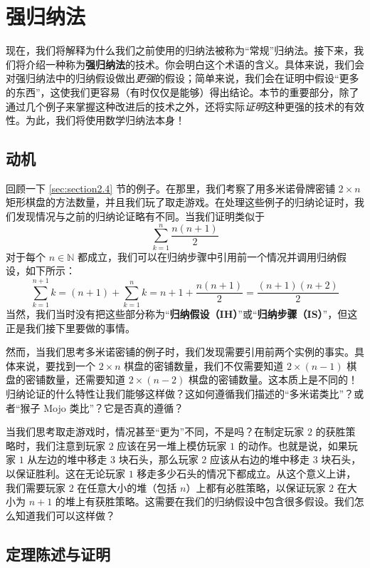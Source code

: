\section{强归纳法}

现在，我们将解释为什么我们之前使用的归纳法被称为``常规''归纳法。接下来，我们将介绍一种称为\textbf{强归纳法}的技术。你会明白这个术语的含义。具体来说，我们会对强归纳法中的归纳假设做出\emph{更强}的假设；简单来说，我们会在证明中假设``更多的东西''，这使我们更容易（有时仅仅是能够）得出结论。本节的重要部分，除了通过几个例子来掌握这种改进后的技术之外，还将实际\emph{证明}这种更强的技术的有效性。为此，我们将使用数学归纳法本身！

\subsection{动机}

回顾一下 \ref{sec:section2.4} 节的例子。在那里，我们考察了用多米诺骨牌密铺 $2 \times n$ 矩形棋盘的方法数量，并且我们玩了取走游戏。在处理这些例子的归纳论证时，我们发现情况与之前的归纳论证略有不同。当我们证明类似于
\[\sum_{k=1}^{n} \frac{n(n+1)}{2}\]
对于每个 $n \in \mathbb{N}$ 都成立，我们可以在归纳步骤中引用前一个情况并调用归纳假设，如下所示：
\[\sum_{k=1}^{n+1} k=(n+1)+\sum_{k=1}^{n}k = n+1+\frac{n(n+1)}{2} = \frac{(n+1)(n+2)}{2} \]
当然，我们当时没有把这些部分称为``\textbf{归纳假设（IH）}''或``\textbf{归纳步骤（IS）}''，但这正是我们接下里要做的事情。

然而，当我们思考多米诺密铺的例子时，我们发现需要引用前两个实例的事实。具体来说，要找到一个 $2 \times n$ 棋盘的密铺数量，我们不仅需要知道 $2 \times (n-1)$ 棋盘的密铺数量，还需要知道 $2 \times (n-2)$ 棋盘的密铺数量。这本质上是不同的！归纳论证的什么特性让我们能够这样做？这如何遵循我们描述的``多米诺类比''？或者``猴子 Mojo 类比''？它是否真的遵循？

当我们思考取走游戏时，情况甚至``更为''不同，不是吗？在制定玩家 $2$ 的获胜策略时，我们注意到玩家 $2$ 应该在另一堆上模仿玩家 $1$ 的动作。也就是说，如果玩家 $1$ 从左边的堆中移走 $3$ 块石头，那么玩家 $2$ 应该从右边的堆中移走 $3$ 块石头，以保证胜利。这在无论玩家 $1$ 移走多少石头的情况下都成立。从这个意义上讲，我们需要玩家 $2$ 在任意大小的堆（包括 $n$）上都有必胜策略，以保证玩家 $2$ 在大小为 $n + 1$ 的堆上有获胜策略。这需要在我们的归纳假设中包含很多假设。我们怎么知道我们可以这样做？

\subsection{定理陈述与证明}

